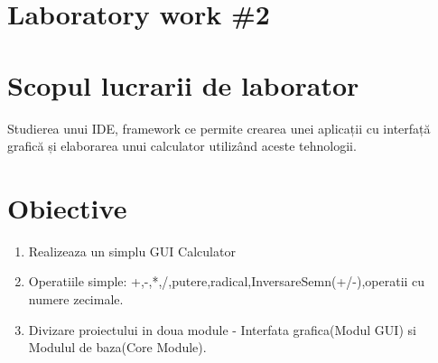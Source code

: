 \section*{Laboratory work \#2}

\section{Scopul lucrarii de laborator}
Studierea unui IDE, framework ce permite crearea unei aplicații cu interfață grafică și elaborarea unui calculator utilizând aceste tehnologii.
\section{Obiective}

\begin{enumerate}
\item Realizeaza un simplu GUI Calculator
\item Operatiile simple: +,-,*,/,putere,radical,InversareSemn(+/-),operatii cu numere zecimale.
\item Divizare proiectului in doua module - Interfata grafica(Modul GUI) si Modulul de baza(Core Module).
\end{enumerate}

\clearpage